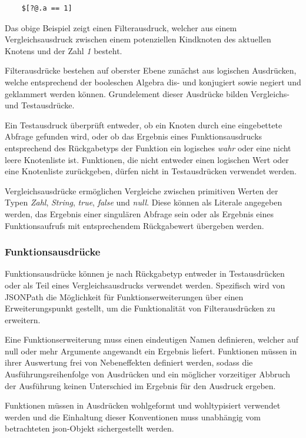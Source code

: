 \documentclass[oneside]{ausarbeitung}
\begin{document}
\begin{lstlisting}
	$[?@.a == 1]
\end{lstlisting}
	
Das obige Beispiel zeigt einen Filterausdruck, welcher aus einem Vergleichsausdruck zwischen einem potenziellen Kindknoten des aktuellen Knotens und der Zahl \textit{1} besteht.
	
Filterausdrücke bestehen auf oberster Ebene zunächst aus logischen Ausdrücken, welche entsprechend der booleschen Algebra dis- und konjugiert sowie negiert und geklammert werden können. Grundelement dieser Ausdrücke bilden Vergleichs- und Testausdrücke.
	
Ein Testausdruck überprüft entweder, ob ein Knoten durch eine eingebettete Abfrage gefunden wird, oder ob das Ergebnis eines Funktionsausdrucks entsprechend des Rückgabetyps der Funktion ein logisches \textit{wahr} oder eine nicht leere Knotenliste ist. Funktionen, die nicht entweder einen logischen Wert oder eine Knotenliste zurückgeben, dürfen nicht in Testausdrücken verwendet werden.
	
Vergleichsausdrücke ermöglichen Vergleiche zwischen primitiven Werten der Typen \textit{Zahl}, \textit{String}, \textit{true}, \textit{false} und \textit{null}. Diese können als Literale angegeben werden, das Ergebnis einer singulären Abfrage sein oder als Ergebnis eines Funktionsaufrufs mit entsprechendem Rückgabewert übergeben werden.
	
\subsubsection{Funktionsausdrücke}
	
Funktionsausdrücke können je nach Rückgabetyp entweder in Testausdrücken oder als Teil eines Vergleichsausdrucks verwendet werden. Spezifisch wird von JSONPath die Möglichkeit für Funktionserweiterungen über einen Erweiterungspunkt gestellt, um die Funktionalität von Filterausdrücken zu erweitern.

Eine Funktionserweiterung muss einen eindeutigen Namen definieren, welcher auf null oder mehr Argumente angewandt ein Ergebnis liefert. Funktionen müssen in ihrer Auswertung frei von Nebeneffekten definiert werden, sodass die Ausführungsreihenfolge von Ausdrücken und ein möglicher vorzeitiger Abbruch der Ausführung keinen Unterschied im Ergebnis für den Ausdruck ergeben.

Funktionen müssen in Ausdrücken wohlgeformt und wohltypisiert verwendet werden und die Einhaltung dieser Konventionen muss unabhängig vom betrachteten \ac{json}-Objekt sichergestellt werden.
\end{document}
